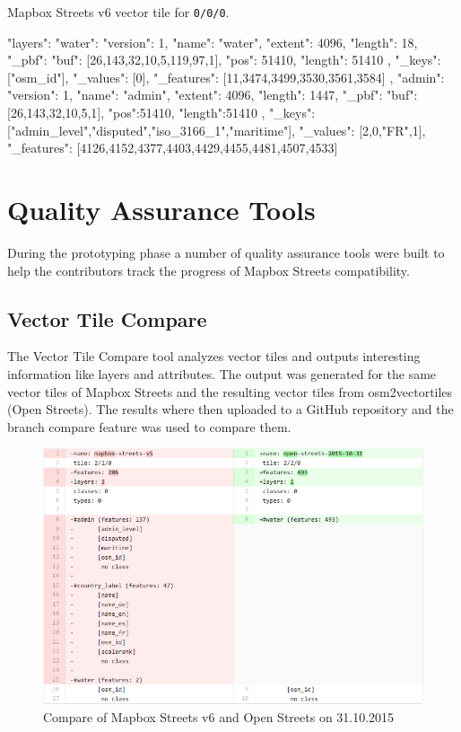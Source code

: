 Mapbox Streets v6 vector tile for \texttt{0/0/0}.
\begin{jsoncode}
{ 
  "layers": {
    "water": {
      "version": 1,
      "name": "water",
      "extent": 4096,
      "length": 18,
      "_pbf": {
        "buf": [26,143,32,10,5,119,97,1],
        "pos": 51410,
        "length": 51410
      },
      "_keys": ["osm_id"],
      "_values": [0],
      "_features": [11,3474,3499,3530,3561,3584] 
    },
    "admin": {
      "version": 1,
      "name": "admin",
      "extent": 4096,
      "length": 1447,
      "_pbf": {
        "buf": [26,143,32,10,5,1],
        "pos":51410,
        "length":51410
       },
      "_keys": ["admin_level","disputed","iso_3166_1","maritime"],
      "_values": [2,0,"FR",1],
      "_features": [4126,4152,4377,4403,4429,4455,4481,4507,4533]
    }
  } 
}
\end{jsoncode}

\section{Quality Assurance Tools}\label{tools}
During the prototyping phase a number of quality assurance tools were built to help the contributors track the progress of Mapbox Streets compatibility.

\subsection{Vector Tile Compare}\label{vector_tile_compare}
The Vector Tile Compare tool analyzes vector tiles and outputs interesting information like layers and attributes. 
The output was generated for the same vector tiles of Mapbox Streets and the resulting vector tiles from osm2vectortiles (Open Streets).
The results where then uploaded  to a GitHub repository and the branch compare feature was used to compare them. 

\begin{figure}[H]
  \centering
  \includegraphics[width=1\textwidth]{images/vector_tile_compare.png}
  \caption{Compare of Mapbox Streets v6 and Open Streets on 31.10.2015}
\end{figure}


